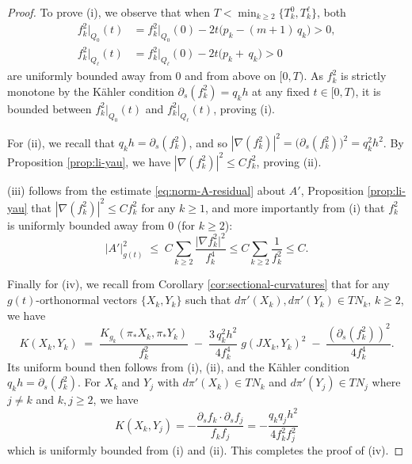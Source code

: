 \documentclass[11pt]{amsart}
\theoremstyle{plain}
\numberwithin{equation}{section}
\theoremstyle{definition}
\theoremstyle{remark}
\begin{document}
\begin{proof}
To prove (i), we observe that when $T < \min_{k\geq 2}\{T_k^0, T_k^\ell\}$, both
\begin{align*}
f_k^2\big|_{Q_0}(t) & = f_k^2|_{Q_0}(0) - 2t\big( p_k - (m+1)\, q_k \big) > 0,\\
f_k^2\big|_{Q_\ell}(t) & = f_k^2|_{Q_\ell}(0) - 2t\big( p_k +\, q_k \big) > 0
\end{align*}
are uniformly bounded away from $0$ and from above on $[0,T)$. As $f_k^2$ is strictly monotone by the K\"ahler condition $\partial_s (f_k^2) = q_k h$ at any fixed $t \in [0,T)$, it is bounded between $f_k^2\big|_{Q_0}(t)$ and $f_k^2\big|_{Q_\ell}(t)$, proving (i).

For (ii), we recall that $q_k h = \partial_s(f_k^2)$, and so $|\nabla (f_k^2)|^2 = \big(\partial_s (f_k^2)\big)^2 = q_k^2 h^2$. By Proposition \ref{prop:li-yau}, we have $|\nabla(f_k^2)|^2 \leq Cf_k^2$, proving (ii).

(iii) follows from the estimate \eqref{eq:norm-A-residual} about $A'$, Proposition \ref{prop:li-yau} that $|\nabla(f_k^2)|^2 \leq Cf_k^2$ for any $k \geq 1$, and more importantly from (i) that $f_k^2$ is uniformly bounded away from $0$ (for $k \geq 2$):
\[\big| A' \big|^2_{g(t)} \;\leq\; C \sum_{k \geq 2} \frac{\big| \nabla f_k^2 \big|^2}{f_k^4} \leq C \sum_{k\geq 2}\frac{1}{f_k^2} \leq C.\]

Finally for (iv), we recall from Corollary \ref{cor:sectional-curvatures} that for any $g(t)$-orthonormal vectors $\{X_k, Y_k\}$ such that $d\pi'(X_k), d\pi'(Y_k) \in TN_k$, $k \geq 2$, we have
\[
K(X_k, Y_k) \;=\; \frac{K_{g_k}(\pi_* X_k, \pi_* Y_k)}{f_k^2} \;-\; \frac{3\, q_k^2 h^2}{4 f_k^4}\;g(JX_k,Y_k)^2 \;-\; \frac{(\partial_s(f_k^2))^2}{4f_k^4}.
\]
Its uniform bound then follows from (i), (ii), and the K\"ahler condition $q_k h = \partial_s(f_k^2)$. For $X_k$ and $Y_j$ with $d\pi'(X_k) \in TN_k$ and $d\pi'(Y_j) \in TN_j$ where $j \not= k$ and $k, j \geq 2$, we have
\[K(X_k,Y_j) = -\frac{\partial_s f_k \cdot \partial_s f_j}{f_k f_j} = -\frac{q_k q_j h^2}{4f_k^2 f_j^2}\]
which is uniformly bounded from (i) and (ii). This completes the proof of (iv).
\end{proof}
\end{document}
